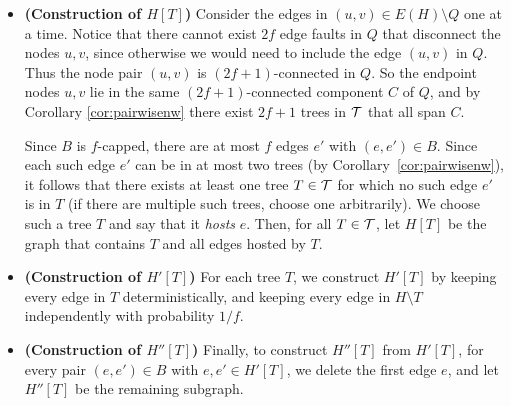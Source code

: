 \begin{itemize}
\item \textbf{(Construction of $H[T]$)}
Consider the edges in $(u, v) \in E(H) \setminus Q$ one at a time.
Notice that there cannot exist $2f$ edge faults in $Q$ that disconnect the nodes $u, v$, since otherwise we would need to include the edge $(u, v)$ in $Q$.
Thus the node pair $(u, v)$ is $(2f+1)$-connected in $Q$.
So the endpoint nodes $u, v$ lie in the same $(2f+1)$-connected component $C$ of $Q$, and by Corollary \ref{cor:pairwisenw} there exist $2f+1$ trees in $\mathcal{T}$ that all span $C$.

Since $B$ is $f$-capped, there are at most $f$ edges $e'$ with $(e, e') \in B$.
Since each such edge $e'$ can be in at most two trees (by Corollary~\ref{cor:pairwisenw}), it follows that there exists at least one tree $T \in \mathcal{T}$ for which no such edge $e'$ is in $T$ (if there are multiple such trees, choose one arbitrarily).
We choose such a tree $T$ and say that it \emph{hosts} $e$.
Then, for all $T \in \mathcal{T}$, let $H[T]$ be the graph that contains $T$ and all edges hosted by $T$.

\item \textbf{(Construction of $H'[T]$)}
For each tree $T$, we construct $H'[T]$ by keeping every edge in $T$ deterministically, and keeping every edge in $H \setminus T$ independently with probability $1/f$.

\item \textbf{(Construction of $H''[T]$)}
Finally, to construct $H''[T]$ from $H'[T]$, for every pair $(e, e') \in B$ with $e, e' \in H'[T]$, we delete the first edge $e$, and let $H''[T]$ be the remaining subgraph.
\end{itemize}

